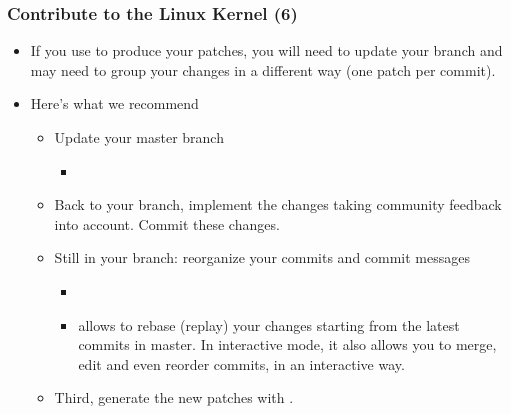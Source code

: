 \begin{frame}
  \frametitle{Contribute to the Linux Kernel (6)}
  \begin{itemize}
  \item If you use  to produce your patches,
    you will need to update your branch and may need to group your
    changes in a different way (one patch per commit).
  \item Here's what we recommend
    \begin{itemize}
    \item Update your master branch
      \begin{itemize}
      \item {}
      \end{itemize}
    \item Back to your branch, implement the changes taking community
      feedback into account. Commit these changes.
    \item Still in your branch: reorganize your commits and commit messages
      \begin{itemize}
      \item {}
      \item {} allows to rebase (replay) your changes
        starting from the latest commits in master. In interactive
        mode, it also allows you to merge, edit and even reorder
        commits, in an interactive way.
      \end{itemize}
    \item Third, generate the new patches with .
    \end{itemize}
  \end{itemize}
\end{frame}

